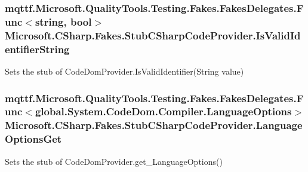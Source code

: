 \hypertarget{class_microsoft_1_1_c_sharp_1_1_fakes_1_1_stub_c_sharp_code_provider_a873d2ce77a7a06b21cec4ea66bd5a5dc}{
\subsubsection[{Is\-Valid\-Identifier\-String}]{\setlength{\rightskip}{0pt plus 5cm}mqttf.\-Microsoft.\-Quality\-Tools.\-Testing.\-Fakes.\-Fakes\-Delegates.\-Func$<$string, bool$>$ Microsoft.\-C\-Sharp.\-Fakes.\-Stub\-C\-Sharp\-Code\-Provider.\-Is\-Valid\-Identifier\-String}}\label{class_microsoft_1_1_c_sharp_1_1_fakes_1_1_stub_c_sharp_code_provider_a873d2ce77a7a06b21cec4ea66bd5a5dc}


Sets the stub of Code\-Dom\-Provider.\-Is\-Valid\-Identifier(\-String value)

\hypertarget{class_microsoft_1_1_c_sharp_1_1_fakes_1_1_stub_c_sharp_code_provider_a8331d941a0643f6ae91388cd0cd3d129}{
\subsubsection[{Language\-Options\-Get}]{\setlength{\rightskip}{0pt plus 5cm}mqttf.\-Microsoft.\-Quality\-Tools.\-Testing.\-Fakes.\-Fakes\-Delegates.\-Func$<$global.\-System.\-Code\-Dom.\-Compiler.\-Language\-Options$>$ Microsoft.\-C\-Sharp.\-Fakes.\-Stub\-C\-Sharp\-Code\-Provider.\-Language\-Options\-Get}}\label{class_microsoft_1_1_c_sharp_1_1_fakes_1_1_stub_c_sharp_code_provider_a8331d941a0643f6ae91388cd0cd3d129}


Sets the stub of Code\-Dom\-Provider.\-get\-\_\-\-Language\-Options()


